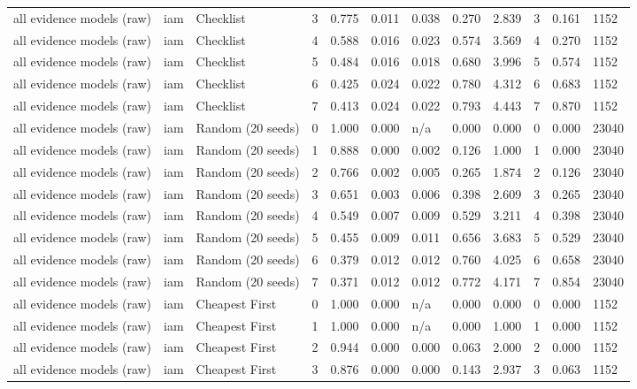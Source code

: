 \begin{table}[!ht]
{\begin{tabular}{llllllllllll}
all evidence models (raw) & iam & Checklist & 3 & 0.775 & 0.011 & 0.038 & 0.270 & 2.839 & 3 & 0.161 & 1152 \\
all evidence models (raw) & iam & Checklist & 4 & 0.588 & 0.016 & 0.023 & 0.574 & 3.569 & 4 & 0.270 & 1152 \\
all evidence models (raw) & iam & Checklist & 5 & 0.484 & 0.016 & 0.018 & 0.680 & 3.996 & 5 & 0.574 & 1152 \\
all evidence models (raw) & iam & Checklist & 6 & 0.425 & 0.024 & 0.022 & 0.780 & 4.312 & 6 & 0.683 & 1152 \\
all evidence models (raw) & iam & Checklist & 7 & 0.413 & 0.024 & 0.022 & 0.793 & 4.443 & 7 & 0.870 & 1152 \\
all evidence models (raw) & iam & Random (20 seeds) & 0 & 1.000 & 0.000 & n/a & 0.000 & 0.000 & 0 & 0.000 & 23040 \\
all evidence models (raw) & iam & Random (20 seeds) & 1 & 0.888 & 0.000 & 0.002 & 0.126 & 1.000 & 1 & 0.000 & 23040 \\
all evidence models (raw) & iam & Random (20 seeds) & 2 & 0.766 & 0.002 & 0.005 & 0.265 & 1.874 & 2 & 0.126 & 23040 \\
all evidence models (raw) & iam & Random (20 seeds) & 3 & 0.651 & 0.003 & 0.006 & 0.398 & 2.609 & 3 & 0.265 & 23040 \\
all evidence models (raw) & iam & Random (20 seeds) & 4 & 0.549 & 0.007 & 0.009 & 0.529 & 3.211 & 4 & 0.398 & 23040 \\
all evidence models (raw) & iam & Random (20 seeds) & 5 & 0.455 & 0.009 & 0.011 & 0.656 & 3.683 & 5 & 0.529 & 23040 \\
all evidence models (raw) & iam & Random (20 seeds) & 6 & 0.379 & 0.012 & 0.012 & 0.760 & 4.025 & 6 & 0.658 & 23040 \\
all evidence models (raw) & iam & Random (20 seeds) & 7 & 0.371 & 0.012 & 0.012 & 0.772 & 4.171 & 7 & 0.854 & 23040 \\
all evidence models (raw) & iam & Cheapest First & 0 & 1.000 & 0.000 & n/a & 0.000 & 0.000 & 0 & 0.000 & 1152 \\
all evidence models (raw) & iam & Cheapest First & 1 & 1.000 & 0.000 & n/a & 0.000 & 1.000 & 1 & 0.000 & 1152 \\
all evidence models (raw) & iam & Cheapest First & 2 & 0.944 & 0.000 & 0.000 & 0.063 & 2.000 & 2 & 0.000 & 1152 \\
all evidence models (raw) & iam & Cheapest First & 3 & 0.876 & 0.000 & 0.000 & 0.143 & 2.937 & 3 & 0.063 & 1152 \\

\end{tabular}}
\end{table}
